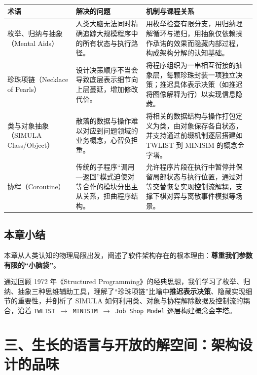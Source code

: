 \documentclass[UTF8,a4paper,11pt,fontset=fandol]{ctexart}
\begin{document}
\begin{center}\small\begin{tabularx}{\linewidth}{YYY}

\toprule

术语 & 解决的问题 & 机制与课程关系\\\midrule

枚举、归纳与抽象（Mental Aids） & 人类大脑无法同时精确追踪大规模程序中的所有状态与执行路径。 & 用枚举检查有限分支，用归纳理解循环与递归，用抽象仅依赖操作承诺的效果而隐藏内部过程，构成架构分解的认知基础。\\[3pt]

珍珠项链（Necklace of Pearls） & 设计决策顺序不当会导致底层表示细节向上层蔓延，增加修改代价。 & 将程序组织为一串相互衔接的抽象层，每颗珍珠封装一项独立决策；推迟具体表示决策（如推迟将图像解释为行）以实现信息隐藏。\\[3pt]

类与对象抽象（SIMULA Class/Object） & 散落的数据与操作难以对应到问题领域的业务概念，心智负担重。 & 将相关的数据结构与操作打包定义为类，由对象保存各自状态，并支持通过前缀机制逐层搭建如 TWLIST 到 MINISIM 的概念金字塔。\\[3pt]

协程（Coroutine） & 传统的子程序“调用—返回”模式迫使对等合作的模块分出主从关系，扭曲程序结构。 & 允许程序片段在执行中暂停并保留局部状态与执行位置，通过对等交替恢复实现控制流解耦，支撑下棋对弈与离散事件模拟等场景。\\[3pt]

\bottomrule\end{tabularx}\end{center}

\subsection{本章小结}

本章从人类认知的物理局限出发，阐述了软件架构存在的根本理由：\textbf{尊重我们参数有限的“小脑袋”}。

通过回顾 1972 年《Structured Programming》的经典思想，我们学习了枚举、归纳、抽象三种思维辅助工具，理解了“珍珠项链”比喻中\textbf{推迟表示决策}、隐藏实现细节的重要性，并剖析了 SIMULA 如何利用类、对象与协程解除数据及控制流的耦合，沿着 \texttt{TWLIST \ensuremath{\rightarrow} MINISIM \ensuremath{\rightarrow} Job Shop Model} 逐层构建概念金字塔。

\section{三、生长的语言与开放的解空间：架构设计的品味}
\end{document}
